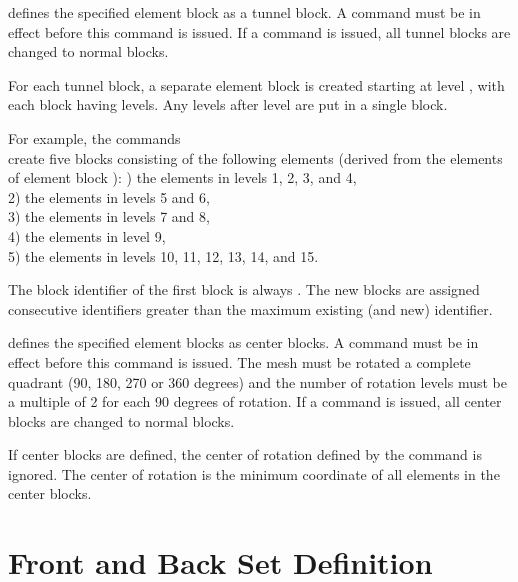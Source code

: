  {
 defines the specified element block as a
tunnel block. A  command must be in effect before this
command is issued. If a  command is issued, all tunnel
blocks are changed to normal blocks.

For each tunnel block, a separate  element block is created
starting at level , with each block having 
levels. Any levels after level  are put in a single block.

For example, the commands
\cenlinesbegin
{} \\
\cenlinesend
create five blocks consisting of the following  elements
(derived from the  elements of element block ):
) the elements in levels 1, 2, 3, and 4, \\
2) the elements in levels 5 and 6, \\
3) the elements in levels 7 and 8, \\
4) the elements in level 9, \\
5) the elements in levels 10, 11, 12, 13, 14, and 15.
\cenlinesend

The block identifier of the first block is always . The new
blocks are assigned consecutive identifiers greater than the maximum
existing (and new) identifier.
}

 {
 defines the specified element blocks 
as center blocks. A
 command must be in effect before this command is issued.
The mesh must be rotated a complete quadrant (90, 180, 270 or 360
degrees) and the number of rotation levels must be a multiple of 2 for
each 90 degrees of rotation. If a \cmd{TRANSLATE} command is issued, all
center blocks are changed to normal blocks.

If center blocks are defined, the center of rotation defined by the
\cmd{ROTATE} command is ignored. The center of rotation is the minimum
coordinate of all elements in the center blocks.
}

\newpage
\section{Front and Back Set Definition}
\label{cmd:setdef}


